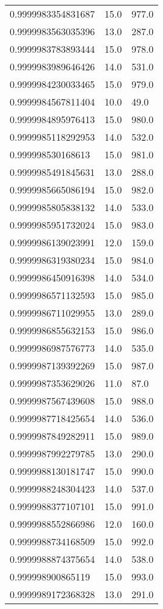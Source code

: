 \begin{center}
\begin{supertabular}[H]{p{0.30\textwidth}p{0.05\textwidth}p{0.05\textwidth}}
0.9999983354831687 & 15.0 & 977.0 \\ 
0.9999983563035396 & 13.0 & 287.0 \\ 
0.9999983783893444 & 15.0 & 978.0 \\ 
0.9999983989646426 & 14.0 & 531.0 \\ 
0.9999984230033465 & 15.0 & 979.0 \\ 
0.9999984567811404 & 10.0 & 49.0 \\ 
0.9999984895976413 & 15.0 & 980.0 \\ 
0.9999985118292953 & 14.0 & 532.0 \\ 
0.999998530168613 & 15.0 & 981.0 \\ 
0.9999985491845631 & 13.0 & 288.0 \\ 
0.9999985665086194 & 15.0 & 982.0 \\ 
0.9999985805838132 & 14.0 & 533.0 \\ 
0.9999985951732024 & 15.0 & 983.0 \\ 
0.9999986139023991 & 12.0 & 159.0 \\ 
0.9999986319380234 & 15.0 & 984.0 \\ 
0.9999986450916398 & 14.0 & 534.0 \\ 
0.9999986571132593 & 15.0 & 985.0 \\ 
0.9999986711029955 & 13.0 & 289.0 \\ 
0.9999986855632153 & 15.0 & 986.0 \\ 
0.9999986987576773 & 14.0 & 535.0 \\ 
0.9999987139392269 & 15.0 & 987.0 \\ 
0.9999987353629026 & 11.0 & 87.0 \\ 
0.9999987567439608 & 15.0 & 988.0 \\ 
0.9999987718425654 & 14.0 & 536.0 \\ 
0.9999987849282911 & 15.0 & 989.0 \\ 
0.9999987992279785 & 13.0 & 290.0 \\ 
0.9999988130181747 & 15.0 & 990.0 \\ 
0.9999988248304423 & 14.0 & 537.0 \\ 
0.9999988377107101 & 15.0 & 991.0 \\ 
0.9999988552866986 & 12.0 & 160.0 \\ 
0.9999988734168509 & 15.0 & 992.0 \\ 
0.9999988874375654 & 14.0 & 538.0 \\ 
0.999998900865119 & 15.0 & 993.0 \\ 
0.9999989172368328 & 13.0 & 291.0 \\ 

\end{supertabular}
\end{center}
